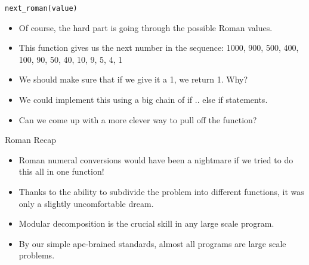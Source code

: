 \documentclass[]{beamer}
\begin{document}
\begin{frame}{\texttt{next\_roman(value)}}
    \begin{itemize}[<+(1)->]
        \item Of course, the hard part is going through the possible
            Roman values.
        \item This function gives us the next number in the sequence:
            1000, 900, 500, 400, 100, 90, 50, 40, 10, 9, 5, 4, 1
        \item We should make sure that if we give it a 1, we return 1.
            Why?
        \item We could implement this using a big chain of if .. else if 
            statements.
        \item Can we come up with a more clever way to pull off the
            function?
    \end{itemize}
\end{frame}

\begin{frame}{Roman Recap}
    \begin{itemize}[<+(1)->]
        \item Roman numeral conversions would have been a nightmare
            if we tried to do this all in one function!
        \item Thanks to the ability to subdivide the problem into
            different functions, it was only a slightly uncomfortable
            dream.
        \item Modular decomposition is the crucial skill in any large
            scale program.
        \item By our simple ape-brained standards, almost all programs
            are large scale problems.
    \end{itemize}
\end{frame}
\end{document}
